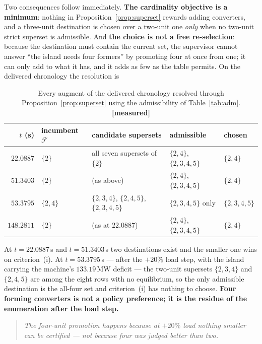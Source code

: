 \documentclass[12pt,a4paper]{article}
\theoremstyle{remark}
\newcommand{\measured}{\textcolor{ok}{\textbf{[measured]}}}
\begin{document}
Two consequences follow immediately. \textbf{The cardinality objective is a
minimum}: nothing in Proposition~\ref{prop:superset} rewards adding converters,
and a three-unit destination is chosen over a two-unit one \emph{only} when no
two-unit strict superset is admissible. And \textbf{the choice is not a free
re-selection}: because the destination must contain the current set, the
supervisor cannot answer ``the island needs four formers'' by promoting four at
once from one; it can only add to what it has, and it adds as few as the table
permits. On the delivered chronology the resolution is

\begin{table}[H]
\centering
\small
\begin{tabularx}{\textwidth}{@{}r l X l l@{}}
\toprule
$t$ (s) & \textbf{incumbent $\mathcal{F}$} & \textbf{candidate supersets} & \textbf{admissible} & \textbf{chosen}\\
\midrule
$22.0887$ & $\{2\}$ & all seven supersets of $\{2\}$
          & $\{2,4\}$, $\{2,3,4,5\}$ & $\{2,4\}$\\
$51.3403$ & $\{2\}$ & (as above) & $\{2,4\}$, $\{2,3,4,5\}$ & $\{2,4\}$\\
$53.3795$ & $\{2,4\}$ & $\{2,3,4\}$, $\{2,4,5\}$, $\{2,3,4,5\}$ & $\{2,3,4,5\}$ only & $\{2,3,4,5\}$\\
$148.2811$& $\{2\}$ & (as at $22.0887$) & $\{2,4\}$, $\{2,3,4,5\}$ & $\{2,4\}$\\
\bottomrule
\end{tabularx}
\caption{Every augment of the delivered chronology resolved through
Proposition~\ref{prop:superset} using the admissibility of
Table~\ref{tab:adm}. \measured}
\label{tab:resolution}
\end{table}

At $t=22.0887$\,s and $t=51.3403$\,s two destinations exist and the smaller one
wins on criterion~(i). At $t=53.3795$\,s --- after the $+20\%$ load step, with
the island carrying the machine's $133.19$\,MW deficit --- the two-unit supersets
$\{2,3,4\}$ and $\{2,4,5\}$ are among the eight rows with no equilibrium, so the
only admissible destination is the all-four set and criterion~(i) has nothing to
choose. \textbf{Four forming converters is not a policy preference; it is the
residue of the enumeration after the load step.}

\begin{quote}\small\itshape
The four-unit promotion happens because at $+20\%$ load nothing smaller can be
certified --- not because four was judged better than two.
\end{quote}
\end{document}
